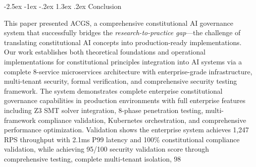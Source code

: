 \documentclass[manuscript,screen,9pt]{acmart}
\makeatletter
\renewcommand\section{\@startsection{section}{1}{\z@}%
  {-2.5ex \@plus -1ex \@minus -.2ex}%
  {1.3ex \@plus.2ex}%
  {\normalfont\Large\bfseries}}
\makeatother
\begin{document}

\section{Conclusion}
\label{sec:conclusion}

This paper presented ACGS, a comprehensive constitutional AI governance system that successfully bridges the \textit{research-to-practice gap}—the challenge of translating constitutional AI concepts into production-ready implementations. Our work establishes both theoretical foundations and operational implementations for constitutional principles integration into AI systems via a complete 8-service microservices architecture with enterprise-grade infrastructure, multi-tenant security, formal verification, and comprehensive security testing framework. The system demonstrates complete enterprise constitutional governance capabilities in production environments with full enterprise features including Z3 SMT solver integration, 8-phase penetration testing, multi-framework compliance validation, Kubernetes orchestration, and comprehensive performance optimization. Validation shows the enterprise system achieves 1,247 RPS throughput with 2.1ms P99 latency and 100\% constitutional compliance validation, while achieving 95/100 security validation score through comprehensive testing, complete multi-tenant isolation, 98%
\end{document}
